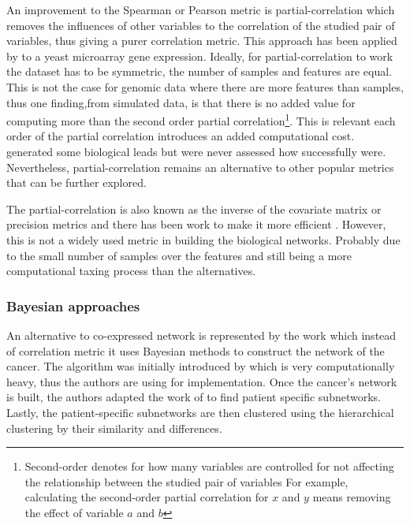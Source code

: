 An improvement to the Spearman or Pearson metric is partial-correlation which removes the influences of other variables to the correlation of the studied pair of variables, thus giving a purer correlation metric. This approach has been applied by \citet{De_la_Fuente2004-ts} to a yeast microarray gene expression. Ideally, for partial-correlation to work the dataset has to be symmetric, the number of samples and features are equal. This is not the case for genomic data where there are more features than samples, thus one finding,from simulated data, is that there is no added value for computing more than the second order partial correlation\footnote{Second-order denotes for how many variables are controlled for not affecting the relationship between the studied pair of variables For example, calculating the second-order partial correlation for $x$ and $y$ means removing the effect of variable $a$ and $b$}. This is relevant each order of the partial correlation introduces an added computational cost. \citet{De_la_Fuente2004-ts} generated some biological leads but were never assessed how successfully were. Nevertheless, partial-correlation remains an alternative to other popular metrics that can be further explored.

The partial-correlation is also known as the inverse of the covariate matrix or precision metrics and there has been work to make it more efficient \citet{Ghanbari2019-tq}. However, this is not a widely used metric in building the biological networks. Probably due to the small number of samples over the features and still being a more computational taxing process than the alternatives.

\subsubsection{Bayesian approaches}

An alternative to co-expressed network is represented by the work \citet{Nakazawa2021-yq} which instead of correlation metric it uses Bayesian methods to construct the network of the cancer. The algorithm was initially introduced by \citet{Imoto2001-uc} which is very computationally heavy, thus the authors are using \citet{Tamada2011-ok} for implementation. Once the cancer’s network is built, the authors adapted the work of \citet{Tanaka2020-mw} to find patient specific subnetworks. Lastly, the patient-specific subnetworks are then clustered using the hierarchical clustering by their similarity and differences.

